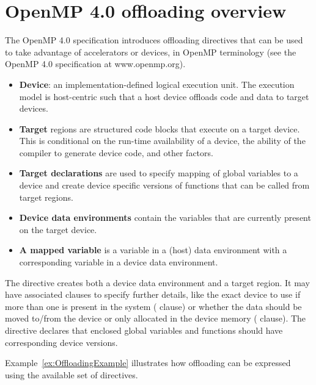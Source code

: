 \section{OpenMP 4.0 offloading overview}\label{sc:OpenMP offloading overview}

The OpenMP 4.0 specification introduces offloading directives that can be used to take advantage of accelerators or devices, in OpenMP terminology (see the OpenMP 4.0 specification at www.openmp.org).
\begin{itemize}
  \item \textbf{Device}: an implementation-defined logical execution unit. The execution model is host-centric such that a host device offloads code and data to target devices.

  \item \textbf{Target} regions are structured code blocks that execute on a target device. This is conditional on the run-time availability of a device, the ability of the compiler to generate device code, and other factors. 

  \item \textbf{Target declarations} are used to specify mapping of global variables to a device and create device specific versions of functions that can be called from target regions.

  \item \textbf{Device data environments} contain the variables that are currently present on the target device.

  \item \textbf{A mapped variable} is a variable in a (host) data environment with a corresponding variable in a device data environment.

\end{itemize}

The \dtarget{} directive creates both a device data environment and a target region. It may have associated clauses to specify further details, like the exact device to use if more than one is present in the system (\cdevice{} clause) or whether the data should be moved to/from the device or only allocated in the device memory (\cmap{} clause). The \ddeclaretarget{} directive declares that enclosed global variables and functions should have corresponding device versions.

Example~\ref{ex:OffloadingExample} illustrates how offloading can be expressed using the available set of directives.


